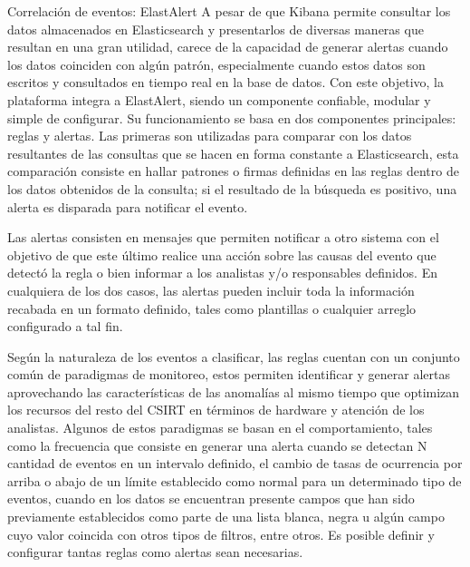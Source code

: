    \begin{section}{Correlación de eventos: ElastAlert}
     A pesar de que Kibana permite consultar los datos almacenados en Elasticsearch y presentarlos de diversas maneras que resultan en una gran utilidad, carece de la capacidad de generar alertas cuando los datos coinciden con algún patrón, especialmente cuando estos datos son escritos y consultados en tiempo real en la base de datos. Con este objetivo, la plataforma integra a ElastAlert, siendo un componente confiable, modular y simple de configurar. Su funcionamiento se basa en dos componentes principales: reglas y alertas. Las primeras son utilizadas para comparar con los datos resultantes de las consultas que se hacen en forma constante a Elasticsearch, esta comparación consiste en hallar patrones o firmas definidas en las reglas dentro de los datos obtenidos de la consulta; si el resultado de la búsqueda es positivo, una alerta es disparada para notificar el evento. \par
     Las alertas consisten en mensajes que permiten notificar a otro sistema con el objetivo de que este último realice una acción sobre las causas del evento que detectó la regla o bien informar a los analistas y/o responsables definidos. En cualquiera de los dos casos, las alertas pueden incluir toda la información recabada en un formato definido, tales como plantillas o cualquier arreglo configurado a tal fin. \par
     Según la naturaleza de los eventos a clasificar, las reglas cuentan con un conjunto común de paradigmas de monitoreo, estos permiten identificar y generar alertas aprovechando las características de las anomalías al mismo tiempo que optimizan los recursos del resto del CSIRT en términos de hardware y atención de los analistas. Algunos de estos paradigmas se basan en el comportamiento, tales como la frecuencia que consiste en generar una alerta cuando se detectan N cantidad de eventos en un intervalo definido, el cambio de tasas de ocurrencia por arriba o abajo de un límite establecido como normal para un determinado tipo de eventos, cuando en los datos se encuentran presente campos que han sido previamente establecidos como parte de una lista blanca, negra u algún campo cuyo valor coincida con otros tipos de filtros, entre otros. Es posible definir y configurar tantas reglas como alertas sean necesarias. \par

   \end{section}
   \pagebreak
